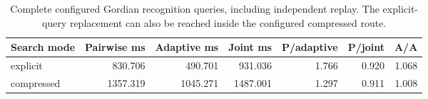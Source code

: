 \begin{table}[htbp]
\centering\small
\setlength{\tabcolsep}{4pt}
\begin{tabular}{@{}lrrrrrr@{}}
\toprule
Search mode & Pairwise ms & Adaptive ms & Joint ms & P/adaptive & P/joint & A/A\\\midrule
explicit & 830.706 & 490.701 & 931.036 & 1.766 & 0.920 & 1.068\\
compressed & 1357.319 & 1045.271 & 1487.001 & 1.297 & 0.911 & 1.008\\
\bottomrule
\end{tabular}
\caption{Complete configured Gordian recognition queries, including independent replay. The explicit-query replacement can also be reached inside the configured compressed route.}
\label{tab:gordian}
\end{table}
